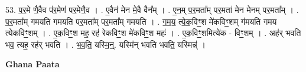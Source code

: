 \documentclass[17pt]{extarticle}
\begin{document}
53. प॒र॒मे णै॒वैव प॑र॒मेण॑ पर॒मेणै॒व । . ए॒वैन॑ मेन मे॒वै वैन᳚म् । . ए॒न॒म् प॒र॒मता᳚म् पर॒मता॑ मेन मेनम् पर॒मता᳚म् । . प॒र॒मता᳚म् गमयति गमयति पर॒मता᳚म् पर॒मता᳚म् गमयति । . ग॒म॒य॒ त्ये॒क॒विꣳ॒॒श मे॑कविꣳ॒॒शम् ग॑मयति गमय त्येकविꣳ॒॒शम् । . ए॒क॒विꣳ॒॒श मह॒ रह॑ रेकविꣳ॒॒श मे॑कविꣳ॒॒श महः॑ । . ए॒क॒विꣳ॒॒शमित्ये॑क - विꣳ॒॒शम् । . अह॑र् भवति भव॒ त्यह॒ रह॑र् भवति । . भ॒व॒ति॒ यस्मि॒न्॒. यस्मि॑न् भवति भवति॒ यस्मिन्न्॑ । \newline

\textbf{Ghana Paata } \newline
\end{document}
